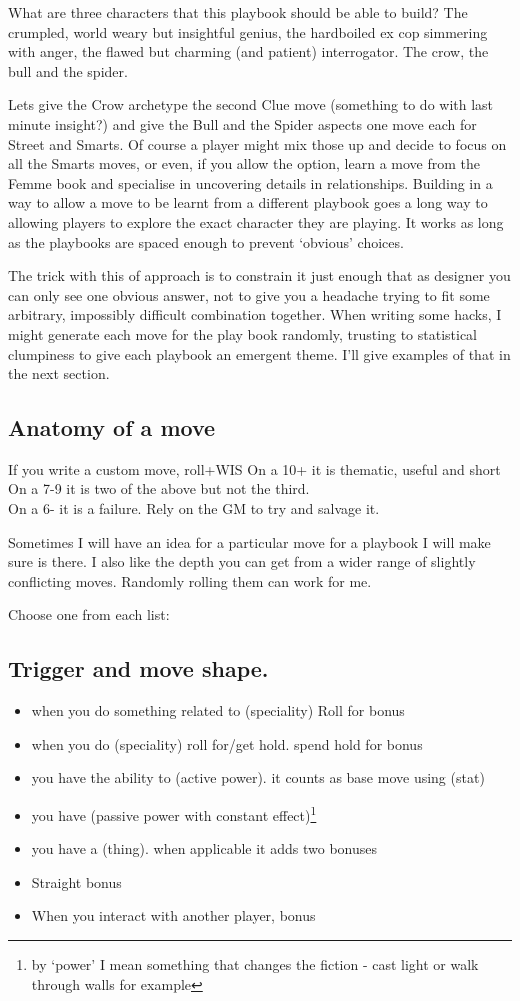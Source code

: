 \documentclass{tufte-handout}
\begin{document}
What are three characters that this playbook should be able to build? The crumpled, world weary but insightful genius, the hardboiled ex cop simmering with anger, the flawed but charming (and patient) interrogator. The crow, the bull and the spider.

Lets give the Crow archetype the second Clue move (something to do with last minute insight?) and give the Bull and the Spider aspects one move each for Street and Smarts. Of course a player might mix those up and decide to focus on all the Smarts moves, or even, if you allow the option, learn a move from the Femme book and specialise in uncovering details in relationships. Building in a way to allow a move to be learnt from a different playbook goes a long way to allowing players to explore the exact character they are playing. It works as long as the playbooks are spaced enough to prevent `obvious' choices.
 
The trick with this of approach is to constrain it just enough that as designer you can only see one obvious answer, not to give you a headache trying to fit some arbitrary, impossibly difficult combination together. 
When writing some hacks, I might generate each move for the play book randomly, trusting to statistical clumpiness to give each playbook an emergent theme. I'll give examples of that in the next section.
 
 \subsection{Anatomy of a move}
If you write a custom move, roll+WIS
On a 10+ it is thematic, useful and short \\
On a 7-9  it is two of the above but not the third.\\
On a 6- it is a failure. Rely on the GM to try and salvage it.

Sometimes I will have an idea for a particular move for a playbook I will make sure is there. I also like the depth you can get from a wider range of slightly conflicting moves. Randomly rolling them can work for me.

Choose one from each list:

\subsection{Trigger and move shape.}
\begin{itemize}
\item when you do something related to (speciality) Roll for bonus
\item when you do (speciality) roll for/get hold. spend hold for bonus
\item you have the ability to (active power). it counts as base move using (stat)
\item you have (passive power with constant effect)\footnote{by `power' I mean something that changes the fiction - cast light or walk through walls for example}
\item you have a (thing). when applicable it adds two bonuses
\item Straight bonus
\item When you interact with another player, bonus
\end{itemize}
\end{document}
